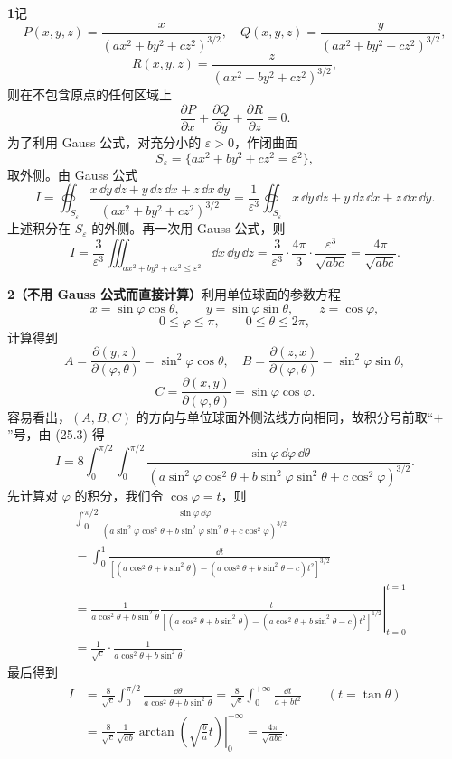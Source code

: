 \begin{xsolution}
\textbf{1}\quad 记
\[
P(x,y,z)=\frac{x}{(ax^2+by^2+cz^2)^{3/2}},\quad
Q(x,y,z)=\frac{y}{(ax^2+by^2+cz^2)^{3/2}},
\]
\[
R(x,y,z)=\frac{z}{(ax^2+by^2+cz^2)^{3/2}},
\]
则在不包含原点的任何区域上
\[
  \frac{\partial P}{\partial x}+\frac{\partial Q}{\partial y}+\frac{\partial R}{\partial z}=0.
\]
为了利用 Gauss 公式，对充分小的 $\varepsilon>0$，作闭曲面
\[
  S_\varepsilon=\{ax^2+by^2+cz^2=\varepsilon^2\},
\]
取外侧。由 Gauss 公式
\[
  I=\oiint_{S_\varepsilon}\frac{x\,\dd y\,\dd z+y\,\dd z\,\dd x+z\,\dd x\,\dd y}{(ax^2+by^2+cz^2)^{3/2}}
  =\frac1{\varepsilon^3}\oiint_{S_\varepsilon}x\,\dd y\,\dd z+y\,\dd z\,\dd x+z\,\dd x\,\dd y.
\]
上述积分在 $S_\varepsilon$ 的外侧。再一次用 Gauss 公式，则
\[
  I=\frac3{\varepsilon^3}\iiint_{ax^2+by^2+cz^2\le\varepsilon^2}\dd x\,\dd y\,\dd z
  =\frac3{\varepsilon^3}\cdot\frac{4\pi}{3}\cdot\frac{\varepsilon^3}{\sqrt{abc}}
  =\frac{4\pi}{\sqrt{abc}}.
\]

\textbf{2（不用 Gauss 公式而直接计算）}\quad 利用单位球面的参数方程
\[
  x=\sin\varphi\cos\theta,\qquad y=\sin\varphi\sin\theta,\qquad z=\cos\varphi,
\]
\[
  0\le\varphi\le\pi,\qquad 0\le\theta\le2\pi,
\]
计算得到
\[
  A=\frac{\partial(y,z)}{\partial(\varphi,\theta)}=\sin^2\varphi\cos\theta,
  \quad B=\frac{\partial(z,x)}{\partial(\varphi,\theta)}=\sin^2\varphi\sin\theta,
\]
\[
  C=\frac{\partial(x,y)}{\partial(\varphi,\theta)}=\sin\varphi\cos\varphi.
\]
容易看出，$(A,B,C)$ 的方向与单位球面外侧法线方向相同，故积分号前取“$+$”号，由 (25.3) 得
\[
  I=8\int_0^{\pi/2}\int_0^{\pi/2}
  \frac{\sin\varphi\,\dd\varphi\,\dd\theta}
  {(a\sin^2\varphi\cos^2\theta+b\sin^2\varphi\sin^2\theta+c\cos^2\varphi)^{3/2}}.
\]
先计算对 $\varphi$ 的积分，我们令 $\cos\varphi=t$，则
\begin{align*}
&\int_0^{\pi/2}\frac{\sin\varphi\,\dd\varphi}
{(a\sin^2\varphi\cos^2\theta+b\sin^2\varphi\sin^2\theta+c\cos^2\varphi)^{3/2}}\\
&=\int_0^1\frac{\dd t}{[(a\cos^2\theta+b\sin^2\theta)-(a\cos^2\theta+b\sin^2\theta-c)t^2]^{3/2}}\\
&=\frac1{a\cos^2\theta+b\sin^2\theta}
\left.\frac{t}{[(a\cos^2\theta+b\sin^2\theta)-(a\cos^2\theta+b\sin^2\theta-c)t^2]^{1/2}}\right|_{t=0}^{t=1}\\
&=\frac1{\sqrt c}\cdot\frac1{a\cos^2\theta+b\sin^2\theta}.
\end{align*}
最后得到
\begin{align*}
I&=\frac8{\sqrt c}\int_0^{\pi/2}\frac{\dd\theta}{a\cos^2\theta+b\sin^2\theta}
=\frac8{\sqrt c}\int_0^{+\infty}\frac{\dd t}{a+bt^2}\qquad(t=\tan\theta)\\
&=\frac8{\sqrt c}\frac1{\sqrt{ab}}
\left.\arctan\left(\sqrt{\frac ba}t\right)\right|_0^{+\infty}
=\frac{4\pi}{\sqrt{abc}}.
\end{align*}
\end{xsolution}

